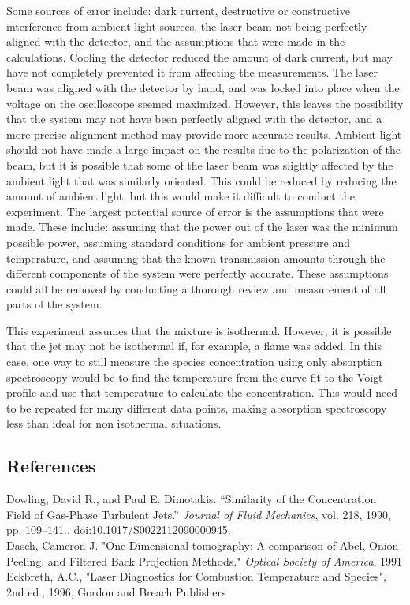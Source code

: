 \documentclass{article}
\begin{document}
\indent Some sources of error include: dark current, destructive or constructive interference from ambient light sources, the laser beam not being perfectly aligned with the detector, and the assumptions that were made in the calculations.  Cooling the detector reduced the amount of dark current, but may have not completely prevented it from affecting the measurements.  The laser beam was aligned with the detector by hand, and was locked into place when the voltage on the oscilloscope seemed maximized.  However, this leaves the possibility that the system may not have been perfectly aligned with the detector, and a more precise alignment method may provide more accurate results. Ambient light should not have made a large impact on the results due to the polarization of the beam, but it is possible that some of the laser beam was slightly affected by the ambient light that was similarly oriented.  This could be reduced by reducing the amount of ambient light, but this would make it difficult to conduct the experiment.  The largest potential source of error is the assumptions that were made.  These include: assuming that the power out of the laser was the minimum possible power, assuming standard conditions for ambient pressure and temperature, and assuming that the known transmission amounts through the different components of the system were perfectly accurate.  These assumptions could all be removed by conducting a thorough review and measurement of all parts of the system. \newline

\indent This experiment assumes that the mixture is isothermal.  However, it is possible that the jet may not be isothermal if, for example, a flame was added.  In this case, one way to still measure the species concentration using only absorption spectroscopy would be to find the temperature from the curve fit to the Voigt profile and use that temperature to calculate the concentration.  This would need to be repeated for many different data points, making absorption spectroscopy less than ideal for non isothermal situations.  
\newpage
\begin{center}
    \section*{References}
\end{center}


Dowling, David R., and Paul E. Dimotakis. “Similarity of the Concentration Field of Gas-Phase Turbulent Jets.” \textit{Journal of Fluid Mechanics}, vol. 218, 1990, pp. 109–141., doi:10.1017/S0022112090000945.
\newline
$$$$
Dasch, Cameron J. "One-Dimensional tomography: A comparison of Abel, Onion-Peeling, and Filtered Back Projection Methods." \textit{Optical Society of America}, 1991
\newline
$$$$
Eckbreth, A.C., "Laser Diagnostics for Combustion Temperature and Species", 2nd ed., 1996, Gordon and Breach Publishers
\newpage
\end{document}
